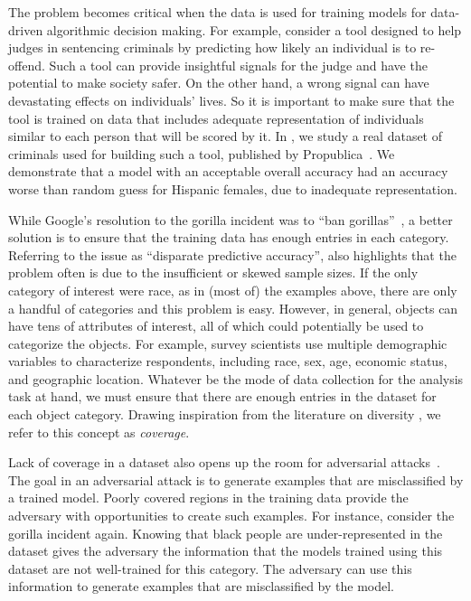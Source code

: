 The problem becomes critical when the data is used for training models for data-driven algorithmic decision making.
For example, %
consider a tool designed to help judges in sentencing criminals by predicting how likely an individual is to re-offend. 
Such a tool can provide insightful signals for the judge and have the potential to make society safer.
On the other hand, a wrong signal can have devastating effects on individuals' lives.
So it is important to make sure that the tool is trained on data that includes adequate representation of individuals similar to each person that will be scored by it.
In \cite{asudeh2019assessing}, we study a real dataset of criminals used for building such a tool, published by Propublica~\cite{propublica}. We demonstrate that a model with an acceptable overall accuracy had an accuracy worse than random guess for Hispanic females, due to inadequate representation.

While Google's resolution to the gorilla incident was to ``ban gorillas''~\cite{google-gorilla-resolution}, a better solution is to ensure that the training data has enough entries in each category.
Referring to the issue as ``disparate predictive accuracy'', \cite{chen2018my} also highlights that the problem often is due to the insufficient or skewed sample sizes.
If the only category of interest were race, as in (most of) the examples above, there are only a handful of categories and this problem is easy.
However, in general, objects can have tens of attributes of interest, all of which could potentially be used to categorize the objects.  
For example, survey scientists use multiple demographic variables to characterize respondents, including race, sex, age, economic status, and geographic location.
Whatever be the mode of data collection for the analysis task at hand, we must ensure that there are enough entries in the dataset for each object category.  
Drawing inspiration from the literature on diversity \cite{diversity-jag}, we refer to this concept as {\em coverage}.

Lack of coverage in a dataset also opens up the room for adversarial attacks~\cite{biggio2013evasion}. The goal in an adversarial attack is to generate examples that are misclassified by a trained model.
Poorly covered regions in the training data provide the adversary with opportunities to create such examples.
For instance, consider the gorilla incident again. Knowing that black people are under-represented in the dataset gives the adversary the information that the models trained using this dataset are not well-trained for this category. The adversary can use this information to generate examples that are misclassified by the model.

